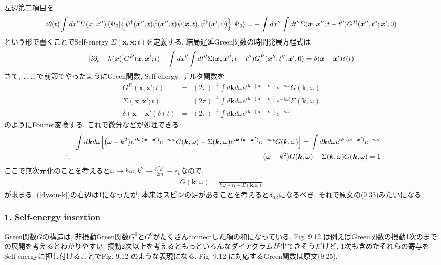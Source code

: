 \documentclass[10.5pt,a4paper]{jreport}
\newcommand{\bx}{\bm{x}}
\newcommand{\bk}{\bm{k}}
\newcommand{\hpsi}{\hat{\psi}}
\begin{document}
左辺第二項目を
\begin{eqnarray}
\nonumber  i\theta(t)\int dx''U(x, x'')\ev{\qty{\hpsi^\dagger(\bx'', t)\hpsi(\bx'', t)\hpsi(\bx, t), \hpsi^\dagger(\bx', 0)}}{\Psi_0} = -\int dx''\int dt''\Sigma(\bx, \bx''; t - t'')G^R(\bx'', t''; \bx', 0)\\
\end{eqnarray}
という形で書くことでSelf-energy $\Sigma(\bx, \bx; t)$を定義する. 結局遅延Green関数の時間発展方程式は
\begin{eqnarray}
  \qty[i\partial_t -h(\bx)]G^R(\bx,\bx';t) -\int dx''\int dt''\Sigma(\bx, \bx''; t - t'')G^R(\bx'', t''; \bx', 0)= \delta(\bx-\bx')\delta(t)
\end{eqnarray}
さて, ここで前節でやったようにGreen関数, Self-energy, デルタ関数を
\begin{eqnarray}
  G^R(\bx, \bx';t) &=& (2\pi)^{-4}\int d\bk d\omega e^{i\bk\cdot(\bx-\bx')}e^{-i\omega t}G(\bk, \omega)\\
  \Sigma(\bx, \bx';t) &=& (2\pi)^{-4}\int d\bk d\omega e^{i\bk\cdot(\bx-\bx')}e^{-i\omega t}\Sigma(\bk, \omega)\\
  \delta(\bx - \bx')\delta(t) &=& (2\pi)^{-4}\int d\bk d\omega e^{i\bk\cdot(\bx - \bx')}e^{-i\omega t}
\end{eqnarray}
のようにFourier変換する. これで微分などが処理できる:
\begin{eqnarray}
\nonumber  &&\int d\bk d\omega \qty[\qty(\omega - k^2)e^{i\bk\cdot(\bx-\bx')}e^{-i\omega t}G(\bk, \omega) - \Sigma(\bk, \omega)e^{i\bk\cdot(\bx-\bx')}e^{-i\omega t}G(\bk, \omega)]= \int d\bk d\omega e^{i\bk\cdot(\bx - \bx')}e^{-i\omega t}\\
   &\therefore& \qty(\omega - k^2)G(\bk, \omega) - \Sigma(\bk, \omega)G(\bk, \omega)= 1\label{dyson-k}
\end{eqnarray}
ここで無次元化のことを考えると$\omega\rightarrow\hbar\omega, k^2\rightarrow \frac{\hbar^2k^2}{2m}\equiv\epsilon_k$なので,
\begin{eqnarray}
  G(\bk, \omega) = \frac{1}{\hbar\omega - \epsilon_k - \Sigma(\bk, \omega)}
\end{eqnarray}
が求まる. (\ref{dyson-k})の右辺は1になったが, 本来はスピンの足があることを考えると$\delta_{\alpha\beta}$になるべき. それで原文の(9.33)みたいになる.

\subsubsection{1. Self-energy insertion}
Green関数$G$の構造は, 非摂動Green関数$G^0$と$G^0$がたくさんconnectした項の和になっている. Fig. 9.12 は例えばGreen関数の摂動1次のまでの展開を考えるとわかりやすい. 摂動2次以上を考えるともっといろんなダイアグラムが出てきそうだけど, 1次も含めたそれらの寄与をSelf-energyに押し付けることでFig. 9.12 のような表現になる. Fig. 9.12 に対応するGreen関数は原文(9.25).
\end{document}

